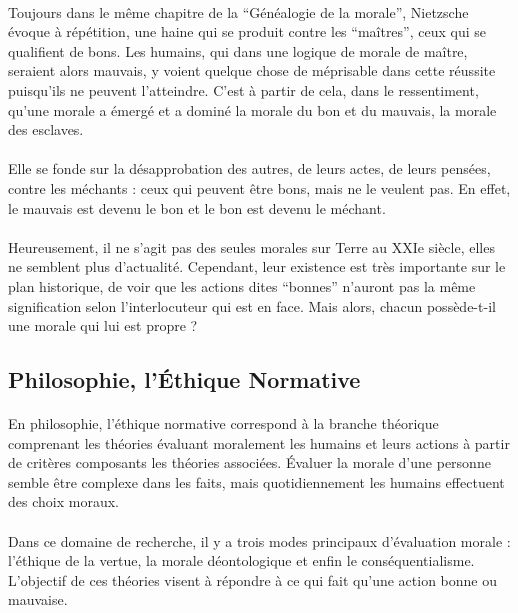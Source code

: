 \documentclass[10pt, french, a4paper]{report}
\begin{document}
\paragraph{}
Toujours dans le même chapitre de la ``Généalogie de la morale'', Nietzsche évoque à répétition, une haine qui se produit contre les ``maîtres'', ceux qui se qualifient de bons. Les humains, qui dans une logique de morale de maître, seraient alors mauvais, y voient quelque chose de méprisable dans cette réussite puisqu’ils ne peuvent l’atteindre. C’est à partir de cela, dans le ressentiment, qu’une morale a émergé et a dominé la morale du bon et du mauvais, la morale des esclaves.

\paragraph{}
Elle se fonde sur la désapprobation des autres, de leurs actes, de leurs pensées, contre les méchants : ceux qui peuvent être bons, mais ne le veulent pas. En effet, le mauvais est devenu le bon et le bon est devenu le méchant.

\paragraph{}
Heureusement, il ne s’agit pas des seules morales sur Terre au XXIe siècle, elles ne semblent plus d’actualité. Cependant, leur existence est très importante sur le plan historique, de voir que les actions dites ``bonnes'' n’auront pas la même signification selon l’interlocuteur qui est en face. Mais alors, chacun possède-t-il une morale qui lui est propre ?

\subsection{Philosophie, l'\uppercase{é}thique Normative}

\paragraph{}
En philosophie, l'éthique normative correspond à la branche théorique comprenant les théories évaluant moralement les humains et leurs actions à partir de critères composants les théories associées. \uppercase{é}valuer la morale d'une personne semble être complexe dans les faits, mais quotidiennement les humains effectuent des choix moraux.

\paragraph{}
Dans ce domaine de recherche, il y a trois modes principaux d'évaluation morale : l'éthique de la vertue, la morale déontologique et enfin le conséquentialisme. L'objectif de ces théories visent à répondre à ce qui fait qu'une action bonne ou mauvaise.
\end{document}
